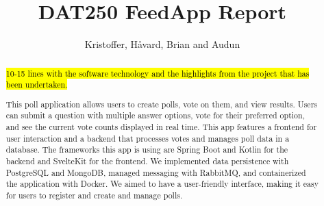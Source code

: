\documentclass[11pt]{article}
\begin{document}
\title{DAT250 FeedApp Report}

\author{Kristoffer, Håvard, Brian and Audun}

\maketitle

\begin{abstract}

\hl{10-15 lines with the software technology and the highlights from the project that has been undertaken.}



 This poll application allows users to create polls, vote on them, and view results. Users can submit a question with multiple answer options, vote for their preferred option, and see the current vote counts displayed in real time. This app features a frontend for user interaction and a backend that processes votes and manages poll data in a database.  The frameworks this app is using are Spring Boot and Kotlin for the backend and SvelteKit for the frontend. We implemented data persistence with PostgreSQL and MongoDB, managed messaging with RabbitMQ, and containerized the application with Docker. We aimed to have a user-friendly interface, making it easy for users to register and create and manage polls.
  

  

\end{abstract}

%	
















\end{document}
